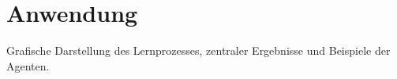 \chapter{Anwendung} \label{chapter:3}
Grafische Darstellung des Lernprozesses, zentraler Ergebnisse und Beispiele der Agenten.